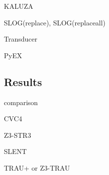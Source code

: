 KALUZA

SLOG(replace), SLOG(replaceall)

Transducer

PyEX \cite{ReynoldsWBBLT17}



\subsection{Results} 
comparison

CVC4

Z3-STR3

SLENT

TRAU+ or Z3-TRAU

